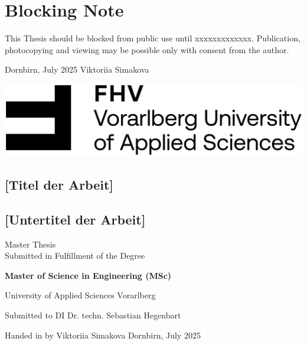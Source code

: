 \documentclass[a4paper,12pt,twoside]{scrreprt}
\begin{document}
\thispagestyle{empty}

\noindent

\section*{Blocking Note}
This Thesis should be blocked from public use until xxxxxxxxxxxxx. 
Publication, photocopying and viewing may be possible only with consent from the author. 


\vspace{3cm}

\noindent Dornbirn, July 2025 \hfill Viktoriia Simakova


\cleardoublepage   %
\thispagestyle{empty}
\begin{titlepage}
  \begin{flushright}
  \includegraphics[width=0.4\linewidth]{Abbildungen/Wort-Bild-Marke-cmyk}  %
  \end{flushright}
  \begin{flushleft}
  \section*{[Titel der Arbeit]}
  \subsection*{[Untertitel der Arbeit]}
  \vspace{1cm}

  Master Thesis\\
  Submitted in Fulfillment of the Degree
  \vspace{0.5cm}

  \textbf{Master of Science in Engineering (MSc)}

  \vspace{1cm}
  University of Applied Sciences Vorarlberg\newline

  \vspace{0.5cm}

  Submitted to\newline
  DI Dr. techn. Sebastian Hegenbart

  \vspace{0.5cm}

  Handed in by\newline
  Viktoriia Simakova\newline
  Dornbirn, July 2025
  \end{flushleft}
\end{titlepage}
\end{document}
